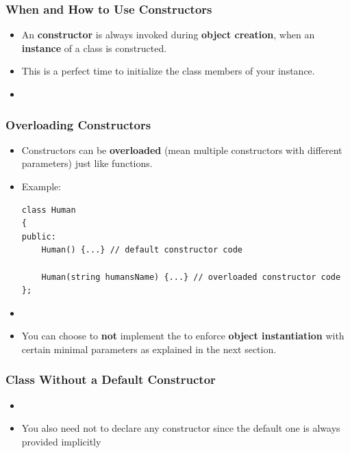 \documentclass[10pt]{article}
\newcommand{\pbreak}{\vspace{30pt}}
\newcommand{\vocab}[1]{\fbox{\textbf{\textit{#1}}}}
\begin{document}
\newpage

\subsubsection{When and How to Use Constructors}
\begin{itemize}
	\item An \textbf{constructor} is always invoked during \textbf{object creation}, when an \textbf{instance} of a class is constructed.
	\item This is a perfect time to initialize the class members of your instance.

	\item {}
\end{itemize}

\pbreak

\subsubsection{Overloading Constructors}
\begin{itemize}
	\item Constructors can be \textbf{overloaded} (mean multiple constructors with different parameters) just like functions.
	\item Example:
	\begin{verbatim}
class Human
{
public:
	Human() {...} // default constructor code

	Human(string humansName) {...} // overloaded constructor code 
};
	\end{verbatim}

\item {}

\item You can choose to \textbf{not} implement the \vocab{default constructor} to enforce \textbf{object instantiation} with certain minimal parameters as explained in the next section.
\end{itemize}

\pbreak

\subsubsection{Class Without a Default Constructor}
\begin{itemize}
\item {}

\item You also need not to declare any constructor since the default one is always provided implicitly
\end{itemize}
\end{document}
